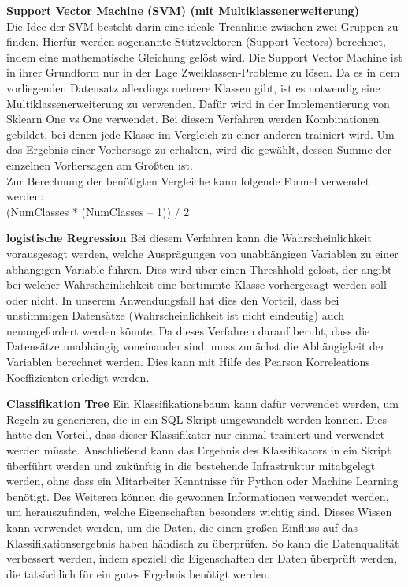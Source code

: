 \textbf{Support Vector Machine (SVM) (mit Multiklassenerweiterung)} \\
Die Idee der SVM besteht darin eine ideale Trennlinie zwischen zwei Gruppen zu finden. 
Hierfür werden sogenannte Stützvektoren (Support Vectors) berechnet, indem eine mathematische Gleichung gelöst wird.
Die Support Vector Machine ist in ihrer Grundform nur in der Lage Zweiklassen-Probleme zu lösen.
Da es in dem vorliegenden Datensatz allerdings mehrere Klassen gibt, ist es notwendig eine Multiklassenerweiterung zu verwenden.
Dafür wird in der Implementierung von Sklearn One vs One verwendet. 
Bei diesem Verfahren werden Kombinationen gebildet, bei denen jede Klasse im Vergleich zu einer anderen trainiert wird.
Um das Ergebnis einer Vorhersage zu erhalten, wird die gewählt, dessen Summe der einzelnen Vorhersagen am Größten ist. 
\\ 
Zur Berechnung der benötigten Vergleiche kann folgende Formel verwendet werden:\\
(NumClasses * (NumClasses – 1)) / 2


\textbf{logistische Regression} %
Bei diesem Verfahren kann die Wahrscheinlichkeit vorausgesagt werden, welche Ausprägungen von unabhängigen Variablen zu einer abhängigen Variable führen. 
Dies wird über einen Threshhold gelöst, der angibt bei welcher Wahrscheinlichkeit eine bestimmte Klasse vorhergesagt werden soll oder nicht.
In unserem Anwendungsfall hat dies den Vorteil, dass bei unstimmigen Datensätze (Wahrscheinlichkeit ist nicht eindeutig) auch neuangefordert werden könnte. 
Da dieses Verfahren darauf beruht, dass die Datensätze unabhängig voneinander sind, muss zunächst die Abhängigkeit der Variablen berechnet werden.
Dies kann mit Hilfe des Pearson Korreleations Koeffizienten erledigt werden.

\textbf{Classifikation Tree}
Ein Klassifikationsbaum kann dafür verwendet werden, um Regeln zu generieren, die in ein SQL-Skript umgewandelt werden können.
Dies hätte den Vorteil, dass dieser Klassifikator nur einmal trainiert und verwendet werden müsste.
Anschließend kann das Ergebnis des Klassifikators in ein Skript überführt werden und zukünftig in die bestehende Infrastruktur mitabgelegt werden, ohne dass ein Mitarbeiter Kenntnisse für Python oder Machine Learning benötigt. 
Des Weiteren können die gewonnen Informationen verwendet werden, um herauszufinden, welche Eigenschaften besonders wichtig sind.
Dieses Wissen kann verwendet werden, um die Daten, die einen großen Einfluss auf das Klassifikationsergebnis haben händisch zu überprüfen. 
So kann die Datenqualität verbessert werden, indem speziell die Eigenschaften der Daten überprüft werden, die tatsächlich für ein gutes Ergebnis benötigt werden.


